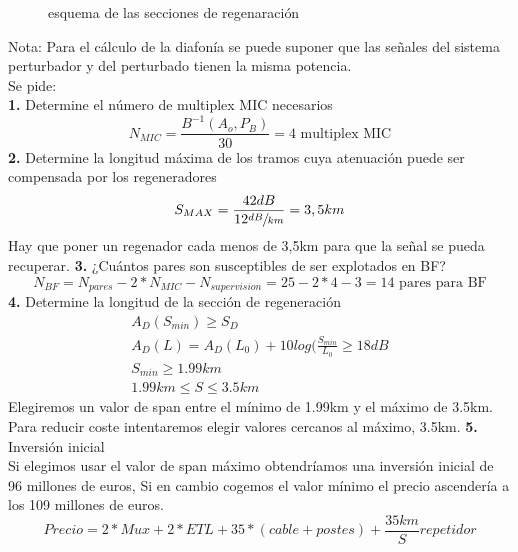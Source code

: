 \begin{exercise}[7]
\begin{figure}[htp]
	\caption{esquema de las secciones de regenaración}
	\end{figure}
	Nota: Para el cálculo de la diafonía se puede suponer que las señales del sistema perturbador y del perturbado tienen la misma potencia.\\
	Se pide:\\
	\textbf{1.} Determine el número de multiplex MIC necesarios\\
	\[N_{MIC}=\frac{B^{-1}(A_o,P_B)}{30}=4\text{ multiplex MIC}\]
	\textbf{2.} Determine la longitud máxima de los tramos cuya atenuación puede ser compensada por los regeneradores\\
	\[S_{MAX}=\frac{42dB}{12\sfrac{dB}{km}}=3,5km\]
	Hay que poner un regenador cada menos de 3,5km para que la señal se pueda recuperar.
	\textbf{3.} ¿Cuántos pares son susceptibles de ser explotados en BF?\\
	\[N_{BF}=N_{pares}-2*N_{MIC}-N_{supervision}=25-2*4-3=14\text{ pares para BF}\]
	\textbf{4.} Determine la longitud de la sección de regeneración\\
	\begin{gather*}
		A_D(S_{min})\geq S_D\\
		A_D(L)=A_D(L_0)+10log(\frac{S_{min}}{L_0}\geq 18dB\\
		S_{min}\geq 1.99km\\
		1.99km\leq S \leq 3.5km
	\end{gather*}
	Elegiremos un valor de span entre el mínimo de 1.99km y el máximo de 3.5km. Para reducir coste intentaremos elegir valores cercanos al máximo, 3.5km.
	\textbf{5.} Inversión inicial\\
	Si elegimos usar el valor de span máximo obtendríamos una inversión inicial de 96 millones de euros, Si en cambio cogemos el valor mínimo el precio ascendería a los 109 millones de euros.
	\[Precio=2*Mux+2*ETL+35*(cable+postes)+\frac{35km}{S}repetidor\]
\end{exercise}
